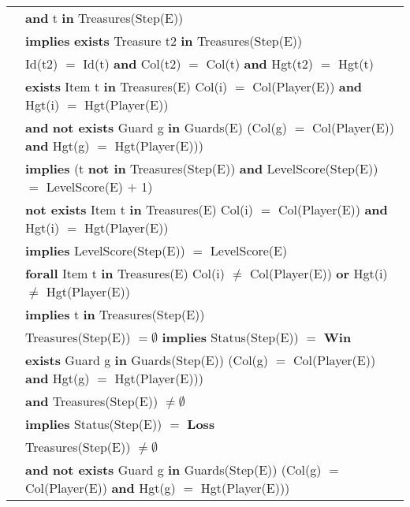 \documentclass[8pt]{article}
\begin{document}
{\begin{longtable}{rl}
  & \quad\quad \textbf{and} t \textbf{in} \textrm{Treasures(Step(E))} \\
  & \quad\quad \textbf{implies} \textbf{exists} \textrm{Treasure} t2 \textbf{in} \textrm{Treasures(Step(E))}\\
  & \quad\quad\quad\quad \textrm{Id(t2)} $=$ \textrm{Id(t)} \textbf{and} \textrm{Col(t2)} $=$ \textrm{Col(t)} \textbf{and} \textrm{Hgt(t2)} $=$ \textrm{Hgt(t)}\\
  & \textbf{exists} \textrm{Item} t \textbf{in} \textrm{Treasures(E)} \textrm{Col(i)} $=$ \textrm{Col(Player(E))} \textbf{and} \textrm{Hgt(i)} $=$ \textrm{Hgt(Player(E))}\\
  & \quad\quad \textbf{and} \textbf{not exists} \textrm{Guard} g \textbf{in} \textrm{Guards(E)} (\textrm{Col(g)} $=$ \textrm{Col(Player(E))} \textbf{and} \textrm{Hgt(g)} $=$ \textrm{Hgt(Player(E))})\\
  & \quad\quad \textbf{implies} (t \textbf{not in} Treasures(Step(E)) \textbf{and} \textrm{LevelScore(Step(E))} $=$ \textrm{LevelScore(E)} $+$ 1)\\
  & \textbf{not exists} \textrm{Item} t \textbf{in} \textrm{Treasures(E)} \textrm{Col(i)} $=$ \textrm{Col(Player(E))} \textbf{and} \textrm{Hgt(i)} $=$ \textrm{Hgt(Player(E))}\\
  & \quad\quad \textbf{implies} \textrm{LevelScore(Step(E))} $=$ \textrm{LevelScore(E)}\\
  & \textbf{forall} \textrm{Item} t \textbf{in} \textrm{Treasures(E)} \textrm{Col(i)} $\ne$ \textrm{Col(Player(E))} \textbf{or} \textrm{Hgt(i)} $\ne$ \textrm{Hgt(Player(E))}\\
  & \quad\quad \textbf{implies} t \textbf{in} \textrm{Treasures(Step(E))}\\
  & \textrm{Treasures(Step(E))} $= \emptyset$ \textbf{implies} \textrm{Status(Step(E))} $=$ \textbf{Win}\\
  & \textbf{exists} \textrm{Guard} g \textbf{in} \textrm{Guards(Step(E))} (\textrm{Col(g)} $=$ \textrm{Col(Player(E))} \textbf{and} \textrm{Hgt(g)} $=$ \textrm{Hgt(Player(E))}) \\
  & \quad\quad \textbf{and} \textrm{Treasures(Step(E))} $\neq \emptyset$\\
  & \quad\quad \textbf{implies} \textrm{Status(Step(E))} $=$ \textbf{Loss}\\
  & \textrm{Treasures(Step(E))} $\ne \emptyset$\\
  & \quad\quad \textbf{and} \textbf{not exists} \textrm{Guard} g \textbf{in} \textrm{Guards(Step(E))} (\textrm{Col(g)} $=$ \textrm{Col(Player(E))} \textbf{and} \textrm{Hgt(g)} $=$ \textrm{Hgt(Player(E))}) \\

\end{longtable}}
\end{document}
